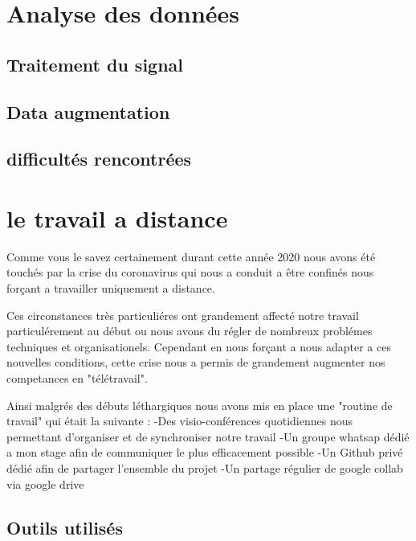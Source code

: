 \section{Analyse des données}


\subsection{Traitement du signal}

\subsection{Data augmentation}


\subsection{difficultés rencontrées}




\section{le travail a distance}

\label{letravailadistance}

Comme vous le savez certainement durant cette année 2020 nous avons été touchés par la crise du coronavirus qui nous a conduit a être confinés nous forçant a travailler uniquement a distance.

Ces circonstances très particuliéres ont grandement affecté notre travail particulérement au début ou nous avons du régler de nombreux problémes techniques et organisationels. Cependant en nous forçant a nous adapter a ces nouvelles conditions, cette crise nous a permis de grandement augmenter nos competances en "télétravail".

Ainsi malgrés des débuts léthargiques nous avons mis en place une "routine de travail" qui était la suivante :
-Des visio-conférences quotidiennes nous permettant d'organiser et de synchroniser notre travail
-Un groupe whatsap dédié a mon stage afin de communiquer le plus efficacement possible
-Un Github privé dédié afin de partager l'ensemble du projet
-Un partage régulier de google collab via google drive

%

\subsection{Outils utilisés}

